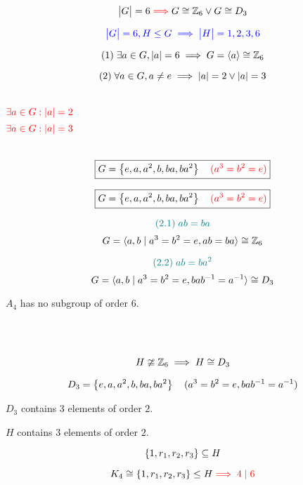 \begin{frame}
  \begin{theorem}
	\[
	  \big\lvert G \big\rvert = 6 \textcolor{red}{\implies} G \cong \mathbb{Z}_{6} \lor G \cong D_3
	\]
  \end{theorem}

  \pause
  \[
	\textcolor{blue}{\big\lvert G \big\rvert = 6, H \le G \implies \big\lvert H \big\rvert = 1, 2, 3, 6}
  \]

  \pause
  \[
	(1)\; \exists a \in G, \lvert a \rvert = 6 \implies G = \langle a \rangle \cong \mathbb{Z}_{6}
  \]

  \pause
  \vspace{-0.50cm}
  \[
	(2)\; \forall a \in G, a \neq e \implies \lvert a \rvert = 2 \lor \lvert a \rvert = 3
  \]
  
  \pause
  \begin{columns}
	  \[
		\textcolor{red}{\exists a \in G: \lvert a \rvert = 2}
	  \]
	  \[
		\textcolor{red}{\exists a \in G: \lvert a \rvert = 3}
	  \]
  \end{columns}

  \pause
  \[
	\boxed{G = \left\{e, a, a^2, b, ba, ba^2\right\} \quad \textcolor{red}{(a^3 = b^2 = e)}}
  \]
\end{frame}

\begin{frame}
  \[
	\boxed{G = \left\{e, a, a^2, b, ba, ba^2\right\} \quad \textcolor{red}{(a^3 = b^2 = e)}}
  \]

  \pause
  \[
	\textcolor{teal}{(2.1)\; ab = ba}
  \]
  \pause
  \[
	G = \langle a, b \mid a^3 = b^2 = e, ab = ba \rangle \cong \mathbb{Z}_6
  \]

  \pause
  \[
	\textcolor{teal}{(2.2)\; ab = ba^2}
  \]
  \pause
  \[
	G = \langle a, b \mid a^3 = b^2 = e, bab^{-1} = a^{-1} \rangle \cong D_3
  \]
\end{frame}

\begin{frame}
  \begin{theorem}[Theorem $6.15$]
	$A_4$ has no subgroup of order $6$.
  \end{theorem}

  \pause
  \begin{center}
	 \\[5pt] \pause
	 \\[5pt] \pause

	\[
	  H \ncong \mathbb{Z}_{6} \implies H \cong D_3
	\]

	\pause
	\[
	  D_3 = \left\{e, a, a^2, b, ba, ba^2\right\} \quad (a^3 = b^2 = e, bab^{-1} = a^{-1})
	\]

	\pause
	$D_3$ contains $3$ elements of order $2$.

	\pause
	$H$ contains $3$ elements of order $2$.

	\pause
	\[
	  \left\{1, r_1, r_2, r_3\right\} \subseteq H
	\]

	\pause
	\vspace{-0.60cm}
	\[
	  K_4 \cong \left\{1, r_1, r_2, r_3\right\} \le H \textcolor{red}{\implies 4 \mid 6}
	\]
  \end{center}
\end{frame}


